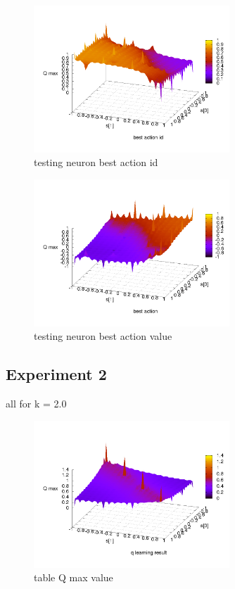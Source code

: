 \documentclass[10pt,a5paper]{article}
\begin{document}
\begin{figure}[!ht]
\centering
\includegraphics[width=2.9in]{q_learning_test/experiment_01/testing_neuron/q_action_id.png}
\caption{testing neuron best action id}
\label{testing neuron best action id}
\end{figure}

\begin{figure}[!ht]
\centering
\includegraphics[width=2.9in]{q_learning_test/experiment_01/testing_neuron/q_action.png}
\caption{testing neuron best action value}
\label{testing neuron best action value}
\end{figure}


\clearpage

\subsection{Experiment 2}

all for k = 2.0

\begin{figure}[!ht]
\centering
\includegraphics[width=2.9in]{q_learning_test/experiment_02/table/q_map.png}
\caption{table Q max value}
\label{table Q max value}
\end{figure}
\end{document}
